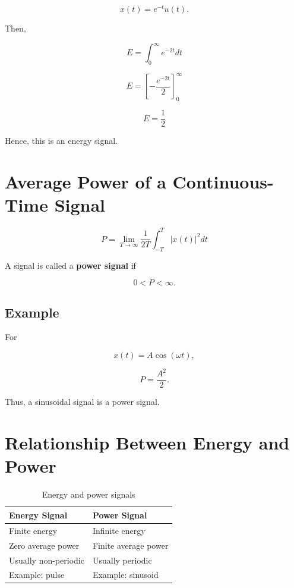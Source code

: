 \[
x(t)=e^{-t}u(t).
\]

Then,

\[
E=\int_0^\infty e^{-2t}dt
\]

\[
E=\left[-\frac{e^{-2t}}{2}\right]_0^\infty
\]

\[
\boxed{
E=\frac{1}{2}
}
\]

Hence, this is an energy signal.


\section{Average Power of a Continuous-Time Signal}

\[
\boxed{
P=\lim_{T\to\infty}\frac{1}{2T}
\int_{-T}^{T}|x(t)|^2dt
}
\]

A signal is called a \textbf{power signal} if

\[
0<P<\infty.
\]


\subsection{Example}

For

\[
x(t)=A\cos(\omega t),
\]

\[
P=\frac{A^2}{2}.
\]

Thus, a sinusoidal signal is a power signal.


\section{Relationship Between Energy and Power}

\begin{table}[H]
\centering
\caption{Energy and power signals}
\begin{tabular}{|p{5cm}|p{5cm}|}
\hline
\textbf{Energy Signal} & \textbf{Power Signal} \\
\hline
Finite energy & Infinite energy \\
\hline
Zero average power & Finite average power \\
\hline
Usually non-periodic & Usually periodic \\
\hline
Example: pulse & Example: sinusoid \\
\hline
\end{tabular}
\end{table}

